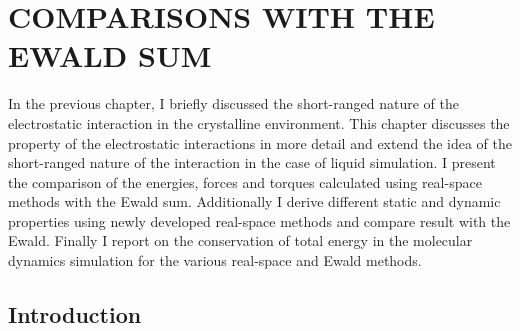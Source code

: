 %
%
%
%
%
%
%
%
%
%

%
%

\chapter{COMPARISONS WITH THE EWALD SUM}
\label{chap:compEwald}

In the previous chapter, I briefly discussed the short-ranged nature of the electrostatic interaction in the crystalline environment. This chapter discusses the property of the electrostatic interactions in more detail and extend the idea of the short-ranged nature of the interaction in the case of liquid simulation. I present the comparison of the energies, forces and torques calculated using real-space methods with the Ewald sum. Additionally I derive different static and dynamic properties using newly developed real-space methods and compare result with the Ewald. Finally I report on the conservation of total energy in the molecular dynamics simulation for the various real-space and Ewald methods.  

\section{Introduction}

